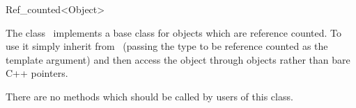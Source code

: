 

\begin{ccRefClass}{Ref_counted<Object>}  %


\ccDefinition
  
The class \ccRefName\ implements a base class for objects which are reference counted. To use it simply inherit from \ccRefName\ (passing the type to be reference counted as the template argument) and then access the object through  objects rather than bare C++ pointers.



\ccTypes


\ccCreation
{}  %


\ccOperations

There are no methods which should be called by users of this class.


\ccExample




\end{ccRefClass}


